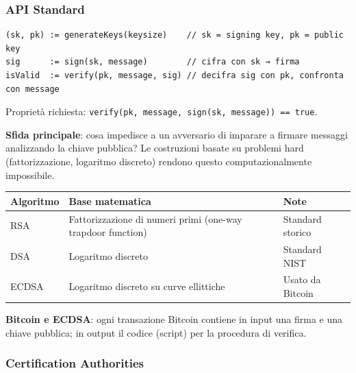 \documentclass[
  italian,
  openany]{book}
\newcounter{none} %
\begin{document}
\subsubsection{API Standard}\label{api-standard}

\begin{verbatim}
(sk, pk) := generateKeys(keysize)    // sk = signing key, pk = public key
sig      := sign(sk, message)        // cifra con sk → firma
isValid  := verify(pk, message, sig) // decifra sig con pk, confronta con message
\end{verbatim}

Proprietà richiesta:
\texttt{verify(pk,\ message,\ sign(sk,\ message))\ ==\ true}.

\textbf{Sfida principale}: cosa impedisce a un avversario di imparare a
firmare messaggi analizzando la chiave pubblica? Le costruzioni basate
su problemi hard (fattorizzazione, logaritmo discreto) rendono questo
computazionalmente impossibile.

{\def\LTcaptype{none} %
\begin{longtable}[]{@{}
  >{\raggedright\arraybackslash}p{}
  >{\raggedright\arraybackslash}p{}
  >{\raggedright\arraybackslash}p{}@{}}
\toprule\noalign{}
\begin{minipage}[b]{\linewidth}\raggedright
Algoritmo
\end{minipage} & \begin{minipage}[b]{\linewidth}\raggedright
Base matematica
\end{minipage} & \begin{minipage}[b]{\linewidth}\raggedright
Note
\end{minipage} \\
\midrule\noalign{}
\endhead
\bottomrule\noalign{}
\endlastfoot
RSA & Fattorizzazione di numeri primi (one-way trapdoor function) &
Standard storico \\
DSA & Logaritmo discreto & Standard NIST \\
ECDSA & Logaritmo discreto su curve ellittiche & Usato da Bitcoin \\
\end{longtable}
}

\textbf{Bitcoin e ECDSA}: ogni transazione Bitcoin contiene in input una
firma e una chiave pubblica; in output il codice (script) per la
procedura di verifica.

\subsubsection{Certification
Authorities}\label{certification-authorities}
\end{document}
